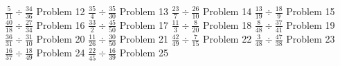 \documentclass{article}
\begin{document}
\hfill \break
$\displaystyle \frac{5}{11} \div \frac{34}{36}$
\newline
\hfill \break
Problem 12
\newline
\hfill \break
$\displaystyle \frac{35}{4} \div \frac{35}{30}$
\newline
\hfill \break
Problem 13
\newline
\hfill \break
$\displaystyle \frac{23}{7} \div \frac{26}{10}$
\newline
\hfill \break
Problem 14
\newline
\hfill \break
$\displaystyle \frac{13}{19} \div \frac{18}{9}$
\newline
\hfill \break
Problem 15
\newline
\hfill \break
$\displaystyle \frac{40}{18} \div \frac{27}{34}$
\newline
\hfill \break
Problem 16
\newline
\hfill \break
$\displaystyle \frac{33}{2} \div \frac{45}{50}$
\newline
\hfill \break
Problem 17
\newline
\hfill \break
$\displaystyle \frac{11}{3} \div \frac{8}{20}$
\newline
\hfill \break
Problem 18
\newline
\hfill \break
$\displaystyle \frac{8}{48} \div \frac{37}{41}$
\newline
\hfill \break
Problem 19
\newline
\hfill \break
$\displaystyle \frac{36}{31} \div \frac{31}{10}$
\newline
\hfill \break
Problem 20
\newline
\hfill \break
$\displaystyle \frac{11}{26} \div \frac{30}{50}$
\newline
\hfill \break
Problem 21
\newline
\hfill \break
$\displaystyle \frac{42}{49} \div \frac{7}{15}$
\newline
\hfill \break
Problem 22
\newline
\hfill \break
$\displaystyle \frac{3}{48} \div \frac{47}{38}$
\newline
\hfill \break
Problem 23
\newline
\hfill \break
$\displaystyle \frac{16}{37} \div \frac{18}{49}$
\newline
\hfill \break
Problem 24
\newline
\hfill \break
$\displaystyle \frac{22}{45} \div \frac{16}{39}$
\newline
\hfill \break
Problem 25
\newline
\hfill \break
\end{document}
